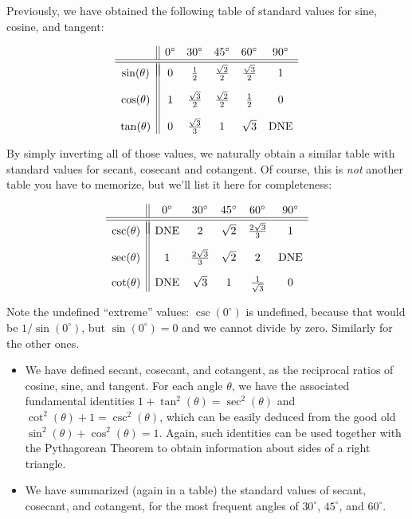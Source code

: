 \documentclass{ximera}
\begin{document}
Previously, we have obtained the following table of standard values for sine, cosine, and tangent:

$$
\begin{array}{c||ccccc}
 & 0^\circ & 30^\circ & 45^\circ & 60^\circ & 90^\circ \\
\hline\hline \\[-1em]  
\sin(\theta) & 0 & \frac{1}{2} & \frac{\sqrt{2}}{2} & \frac{\sqrt{3}}{2} & 1 \\[1em]
 \cos(\theta) & 1 & \frac{\sqrt{3}}{2} & \frac{\sqrt{2}}{2} & \frac{1}{2} & 0 \\[1em]
\tan(\theta)& 0 & \frac{\sqrt{3}}{3} & 1 & \sqrt{3} & {\rm DNE}
\end{array}
$$

By simply inverting all of those values, we naturally obtain a similar table with standard values for secant, cosecant and cotangent. Of course, this is \emph{not} another table you have to memorize, but we'll list it here for completeness:

$$
\begin{array}{c||ccccc}
 & 0^\circ & 30^\circ & 45^\circ & 60^\circ & 90^\circ \\
\hline\hline \\[-1em]  
\csc(\theta) & {\rm DNE} & 2 & \sqrt{2} & \frac{2\sqrt{3}}{3} & 1 \\[1em]
 \sec(\theta) & 1 & \frac{2\sqrt{3}}{3} & \sqrt{2} & 2 & {\rm DNE} \\[1em]
\cot(\theta)& {\rm DNE} & \sqrt{3} & 1 & \frac{1}{\sqrt{3}} & 0
\end{array}
$$

Note the undefined ``extreme'' values: $\csc(0^\circ)$ is undefined, because that would be $1/\sin(0^\circ)$, but $\sin(0^\circ) = 0$ and we cannot divide by zero. Similarly for the other ones.


\begin{summary}\begin{itemize}
\item We have defined secant, cosecant, and cotangent, as the reciprocal ratios of cosine, sine, and tangent. For each angle $\theta$, we have the associated fundamental identities $1+\tan^2(\theta)=\sec^2(\theta)$ and $\cot^2(\theta) + 1 = \csc^2(\theta)$, which can be easily deduced from the good old $\sin^2(\theta)+\cos^2(\theta)=1$. Again, such identities can be used together with the Pythagorean Theorem to obtain information about sides of a right triangle.
\item We have summarized (again in a table) the standard values of secant, cosecant, and cotangent, for the most frequent angles of $30^\circ$, $45^\circ$, and $60^\circ$.
\end{itemize}\end{summary}
\end{document}
